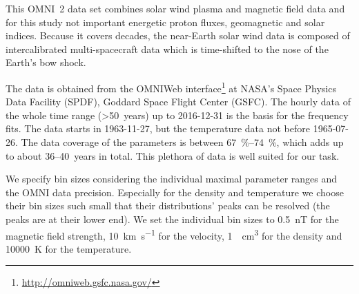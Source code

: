 This OMNI~2 data set \citep{King2005} combines solar wind plasma and magnetic field data and for this study not important energetic proton fluxes, geomagnetic and solar indices. Because it covers decades, the near-Earth solar wind data is composed of intercalibrated multi-spacecraft data which is time-shifted to the nose of the Earth's bow shock.

The data is obtained from the OMNIWeb interface\footnote{\url{http://omniweb.gsfc.nasa.gov/}} at NASA's Space Physics Data Facility (SPDF), Goddard Space Flight Center (GSFC).
%
The hourly data of the whole time range (\textgreater50~years) up to \mbox{2016-12-31} is the basis for the frequency fits. The data starts in \mbox{1963-11-27}, but the temperature data not before \mbox{1965-07-26}. The data coverage of the parameters is between \SIrange{67}{74}{\percent}, which adds up to about 36--40~years in total. This plethora of data is well suited for our task.

We specify bin sizes considering the individual maximal parameter ranges and the OMNI data precision. Especially for the density and temperature we choose their bin sizes such small that their distributions' peaks can be resolved (the peaks are at their lower end). We set the individual bin sizes to \SI{0.5}{nT} for the magnetic field strength, \SI{10}{\km\per\s} for the velocity, \SI{1}{\per\cm\cubed} for the density and \SI{10000}{\K} for the temperature.

